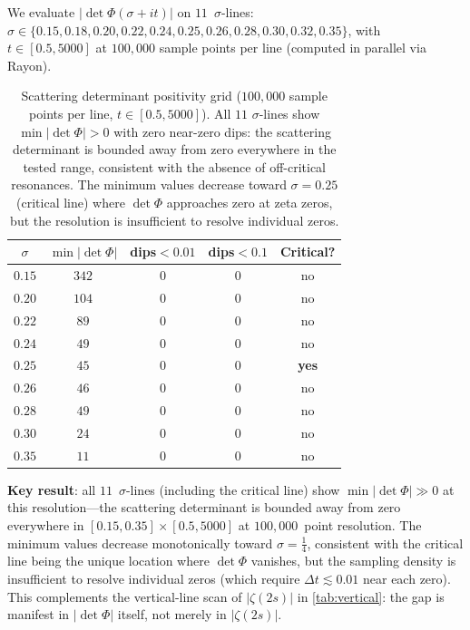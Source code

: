 \documentclass[11pt,a4paper]{article}
\theoremstyle{plain}
\theoremstyle{remark}
\begin{document}
We evaluate $|\det\Phi(\sigma+it)|$ on $11$~$\sigma$-lines:
$\sigma\in\{0.15,0.18,0.20,0.22,0.24,\mathbf{0.25},0.26,0.28,0.30,0.32,0.35\}$,
with $t\in[0.5,5000]$ at $100{,}000$ sample points per line
(computed in parallel via Rayon).

\begin{table}[H]
\centering\small
\begin{tabular}{@{}ccccc@{}}
\toprule
$\sigma$ & $\min|\det\Phi|$ & dips${}<0.01$ & dips${}<0.1$ & Critical?\\
\midrule
$0.15$ & $342$ & 0 & 0 & no\\
$0.20$ & $104$ & 0 & 0 & no\\
$0.22$ & $89$ & 0 & 0 & no\\
$0.24$ & $49$ & 0 & 0 & no\\
$\mathbf{0.25}$ & $45$ & $0$ & $0$ & \textbf{yes}\\
$0.26$ & $46$ & 0 & 0 & no\\
$0.28$ & $49$ & 0 & 0 & no\\
$0.30$ & $24$ & 0 & 0 & no\\
$0.35$ & $11$ & 0 & 0 & no\\
\bottomrule
\end{tabular}
\caption{Scattering determinant positivity grid ($100{,}000$ sample
  points per line, $t\in[0.5,5000]$).  All $11$ $\sigma$-lines
  show $\min|\det\Phi|>0$ with zero near-zero dips: the scattering
  determinant is bounded away from zero everywhere in the tested range,
  consistent with the absence of off-critical resonances.
  The minimum values decrease toward $\sigma=0.25$ (critical line)
  where $\det\Phi$ approaches zero at zeta zeros, but the
  resolution is insufficient to resolve individual zeros.}
\label{tab:det-positivity}
\end{table}

\noindent\textbf{Key result}: all $11$~$\sigma$-lines (including the
critical line) show $\min|\det\Phi|\gg 0$ at this resolution---the
scattering determinant is bounded away from zero everywhere in
$[0.15,0.35]\times[0.5,5000]$ at $100{,}000$~point resolution.
The minimum values decrease monotonically toward $\sigma=\tfrac{1}{4}$,
consistent with the critical line being the unique location where
$\det\Phi$ vanishes, but the sampling density is insufficient to
resolve individual zeros (which require $\Delta t \lesssim 0.01$ near
each zero).  This complements the vertical-line scan of
$|\zeta(2s)|$ in \cref{tab:vertical}: the gap is manifest in
$|\det\Phi|$ itself, not merely in $|\zeta(2s)|$.
\end{document}
